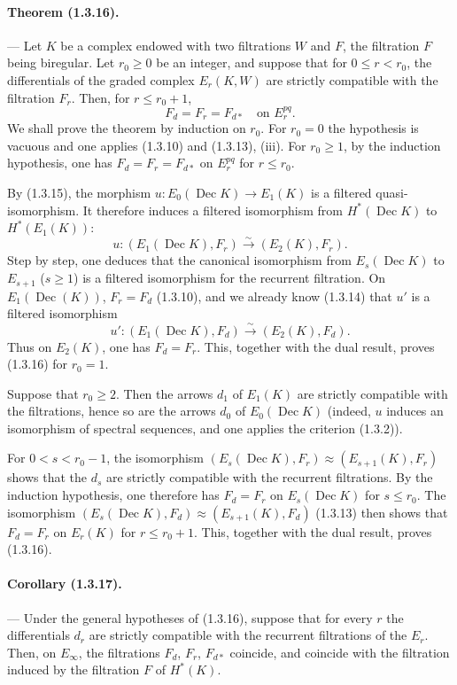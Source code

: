 \documentclass[10pt]{article}
\newcommand{\iso}{\xrightarrow{\sim}}
\newcommand{\Dec}{\operatorname{Dec}}
\begin{document}
\paragraph{Theorem (1.3.16).} --- Let $K$ be a complex endowed with two filtrations $W$ and $F$, the filtration $F$ being biregular. Let $r_0\ge0$ be an integer, and suppose that for $0\le r<r_0$, the differentials of the graded complex $E_r(K,W)$ are strictly compatible with the filtration $F_r$. Then, for $r\le r_0+1$,
\[
F_d=F_r=F_{d*}\quad\text{on }E_r^{pq}.
\]
We shall prove the theorem by induction on $r_0$. For $r_0=0$ the hypothesis is vacuous and one applies (1.3.10) and (1.3.13), (iii). For $r_0\ge1$, by the induction hypothesis, one has $F_d=F_r=F_{d*}$ on $E_r^{pq}$ for $r\le r_0$.

By (1.3.15), the morphism $u:E_0(\Dec K)\to E_1(K)$ is a filtered quasi-isomorphism. It therefore induces a filtered isomorphism from $H^*(\Dec K)$ to $H^*(E_1(K))$:
\[
u:(E_1(\Dec K),F_r)\iso(E_2(K),F_r).
\]
Step by step, one deduces that the canonical isomorphism from $E_s(\Dec K)$ to $E_{s+1}$ ($s\ge1$) is a filtered isomorphism for the recurrent filtration. On $E_1(\Dec(K))$, $F_r=F_d$ (1.3.10), and we already know (1.3.14) that $u'$ is a filtered isomorphism
\[
u':(E_1(\Dec K),F_d)\iso(E_2(K),F_d).
\]
Thus on $E_2(K)$, one has $F_d=F_r$. This, together with the dual result, proves (1.3.16) for $r_0=1$.

Suppose that $r_0\ge2$. Then the arrows $d_1$ of $E_1(K)$ are strictly compatible with the filtrations, hence so are the arrows $d_0$ of $E_0(\Dec K)$ (indeed, $u$ induces an isomorphism of spectral sequences, and one applies the criterion (1.3.2)).

For $0<s<r_0-1$, the isomorphism $(E_s(\Dec K),F_r)\approx(E_{s+1}(K),F_r)$ shows that the $d_s$ are strictly compatible with the recurrent filtrations. By the induction hypothesis, one therefore has $F_d=F_r$ on $E_s(\Dec K)$ for $s\le r_0$. The isomorphism $(E_s(\Dec K),F_d)\approx(E_{s+1}(K),F_d)$ (1.3.13) then shows that $F_d=F_r$ on $E_r(K)$ for $r\le r_0+1$. This, together with the dual result, proves (1.3.16).

\paragraph{Corollary (1.3.17).} --- Under the general hypotheses of (1.3.16), suppose that for every $r$ the differentials $d_r$ are strictly compatible with the recurrent filtrations of the $E_r$. Then, on $E_\infty$, the filtrations $F_d$, $F_r$, $F_{d*}$ coincide, and coincide with the filtration induced by the filtration $F$ of $H^*(K)$.
\end{document}
